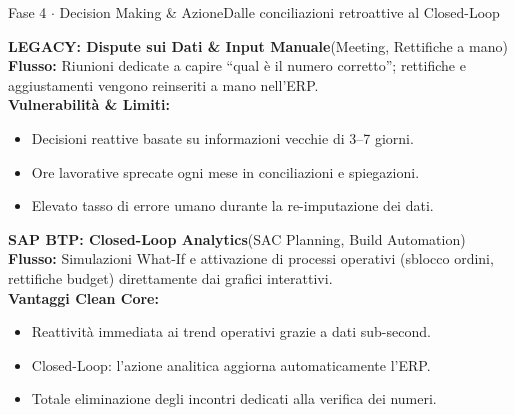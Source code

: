 \documentclass[a4paper,10pt]{extarticle}
\begin{document}
\vspace{-4pt}

\begin{wfphasebox}{Fase 4 $\cdot$ Decision Making \& Azione}{Dalle conciliazioni retroattive al Closed-Loop}
  \begin{tcbraster}[raster columns=2, raster equal height, raster column skip=5pt]
    \begin{tcolorbox}[cardbase, colback=legacybg, colframe=legacyred, leftrule=2.5pt]
      \fontsize{7.3}{8.9}\selectfont
      \textbf{\color{legacydarkred}LEGACY: Dispute sui Dati \& Input Manuale}\hfill\color{textmuted}(Meeting, Rettifiche a mano)\\
      \textbf{Flusso:} Riunioni dedicate a capire ``qual \`e il numero corretto''; rettifiche e aggiustamenti vengono reinseriti a mano nell'ERP.\\
      \textbf{\color{legacydarkred}Vulnerabilit\`a \& Limiti:}
      \begin{itemize}[leftmargin=8pt, itemsep=0pt, topsep=1pt]
        \item Decisioni reattive basate su informazioni vecchie di 3--7 giorni.
        \item Ore lavorative sprecate ogni mese in conciliazioni e spiegazioni.
        \item Elevato tasso di errore umano durante la re-imputazione dei dati.
      \end{itemize}
    \end{tcolorbox}
    \begin{tcolorbox}[cardbase, colback=modernbg, colframe=modernteal, leftrule=2.5pt]
      \fontsize{7.3}{8.9}\selectfont
      \textbf{\color{moderndarkteal}SAP BTP: Closed-Loop Analytics}\hfill\color{textmuted}(SAC Planning, Build Automation)\\
      \textbf{Flusso:} Simulazioni What-If e attivazione di processi operativi (sblocco ordini, rettifiche budget) direttamente dai grafici interattivi.\\
      \textbf{\color{moderndarkteal}Vantaggi Clean Core:}
      \begin{itemize}[leftmargin=8pt, itemsep=0pt, topsep=1pt]
        \item Reattivit\`a immediata ai trend operativi grazie a dati sub-second.
        \item Closed-Loop: l'azione analitica aggiorna automaticamente l'ERP.
        \item Totale eliminazione degli incontri dedicati alla verifica dei numeri.
      \end{itemize}
    \end{tcolorbox}
  \end{tcbraster}
\end{wfphasebox}
\end{document}
